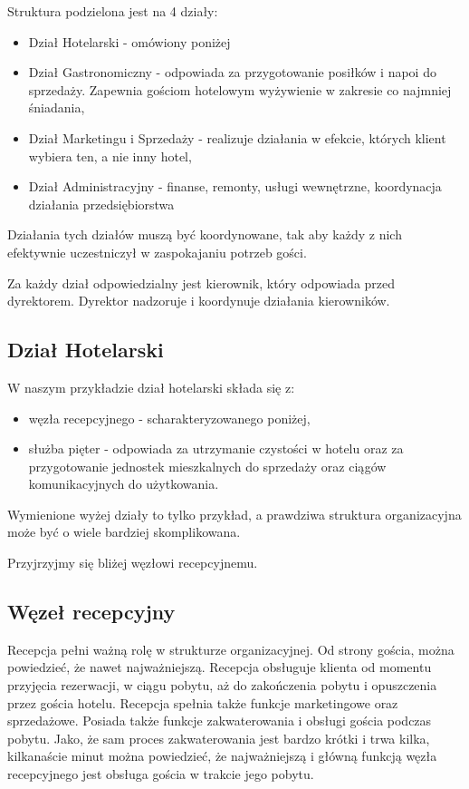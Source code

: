 \documentclass[a4paper,onecolumn,oneside,11pt,wide,floatssmall]{mwrep}
\theoremstyle{definition}
\theoremstyle{plain}%
\theoremstyle{remark}
\begin{document}
Struktura podzielona jest na 4 działy:
\begin{itemize}
  \item Dział Hotelarski - omówiony poniżej
  \item Dział Gastronomiczny - odpowiada za przygotowanie posiłków i napoi 
  do sprzedaży. Zapewnia gościom hotelowym wyżywienie w zakresie co najmniej 
  śniadania,
  \item Dział Marketingu i Sprzedaży - realizuje działania w efekcie, 
  których klient wybiera ten, a nie inny hotel,
  \item Dział Administracyjny - finanse, remonty, usługi wewnętrzne, 
  koordynacja działania przedsiębiorstwa
\end{itemize}

Działania tych działów muszą być koordynowane, tak aby każdy z nich 
efektywnie uczestniczył w zaspokajaniu potrzeb gości.

Za każdy dział odpowiedzialny jest kierownik, który odpowiada przed 
dyrektorem. Dyrektor nadzoruje i koordynuje działania kierowników.

\subsection{Dział Hotelarski}
W naszym przykładzie dział hotelarski składa się z:
\begin{itemize}
  \item węzła recepcyjnego - scharakteryzowanego poniżej,
  \item służba pięter - odpowiada za utrzymanie czystości w hotelu oraz za 
  przygotowanie jednostek mieszkalnych do sprzedaży oraz ciągów 
  komunikacyjnych do użytkowania.
\end{itemize}

Wymienione wyżej działy to tylko przykład, a prawdziwa struktura 
organizacyjna może być o wiele bardziej skomplikowana.

Przyjrzyjmy się bliżej węzłowi recepcyjnemu.

\subsection{Węzeł recepcyjny}
Recepcja pełni ważną rolę w strukturze organizacyjnej. Od strony gościa, 
można powiedzieć, że nawet najważniejszą. 
Recepcja obsługuje klienta od momentu przyjęcia rezerwacji, w ciągu pobytu, 
aż do zakończenia pobytu i opuszczenia przez gościa hotelu. Recepcja spełnia 
także funkcje marketingowe 
oraz sprzedażowe. Posiada także funkcje zakwaterowania i obsługi gościa 
podczas pobytu. Jako, że sam proces zakwaterowania jest bardzo krótki i trwa 
kilka, kilkanaście minut można powiedzieć, że najważniejszą i główną funkcją 
węzła recepcyjnego jest obsługa gościa w trakcie jego pobytu.
\end{document}
